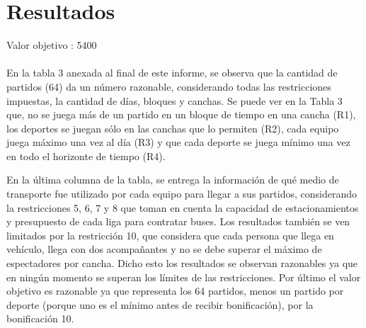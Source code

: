 
\section{Resultados}

\noindent Valor objetivo : 5400\\
\\
\indent En la tabla 3 anexada al final de este informe, se observa que la cantidad de partidos (64) da un número razonable, considerando todas las restricciones impuestas, la cantidad de días, bloques y canchas. Se puede ver en la Tabla 3 que, no se juega más de un partido en un bloque de tiempo en una cancha (R1), los deportes se juegan sólo en las canchas que lo permiten (R2), cada equipo juega máximo una vez al día (R3) y que cada deporte se juega mínimo una vez en todo el horizonte de tiempo (R4).

\indent En la última columna de la tabla, se entrega la información de qué medio de transporte fue utilizado por cada equipo para llegar a sus partidos, considerando la restricciones 5, 6, 7 y 8 que toman en cuenta la capacidad de estacionamientos y presupuesto de cada liga para contratar buses. Los resultados también se ven limitados por la restricción 10, que considera que cada persona que llega en vehículo, llega con dos acompañantes y no se debe superar el máximo de espectadores por cancha. Dicho esto los resultados se observan razonables ya que en ningún momento se superan los límites de las restricciones.
Por último el valor objetivo es razonable ya que representa los 64 partidos, menos un partido por deporte (porque uno es el mínimo antes de recibir bonificación), por la bonificación 10.